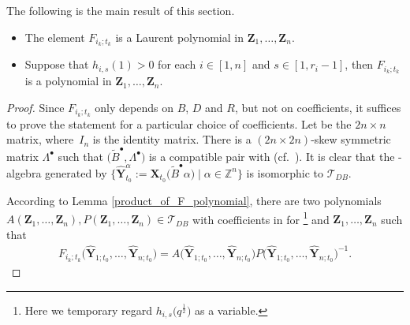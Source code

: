 The following is the main result of this section.
\begin{Theorem}\label{t:F-polynomial}\qquad
\begin{itemize}\itemsep=0pt
 \item[$(1)$] The element $F_{i_k;t_k}$ is a Laurent polynomial in $\mathbf{Z}_1,\dots, \mathbf{Z}_n$.
 \item[$(2)$] Suppose that $h_{i,s}(1)>0$ for each $i\in [1,n]$ and $s\in [1,r_i-1]$, then $F_{i_k;t_k}$ is a polynomial in $\mathbf{Z}_1,\dots, \mathbf{Z}_n$.
\end{itemize}

\end{Theorem}
\begin{proof}
 Since $F_{i_k;t_k}$ only depends on $B$, $D$ and $R$, but not on coefficients, it suffices to prove the statement for a particular choice of coefficients. Let  be the $2n\times n$ matrix, where~$I_n$ is the identity matrix. There is a $(2n\times 2n)$-skew symmetric matrix $\Lambda^{\bullet}$ such that $\bigl(\tilde{B}^{\bullet},\Lambda^{\bullet}\bigr)$ is a compatible pair with  (cf.\ \cite[Example 0.5]{Berenstein_Zelevinsky2005}). It is clear that the -algebra generated by $\bigl\{\mathbf{\hat{Y}}_{t_0}^{\alpha}:=\mathbf{X}_{t_{0}}\bigl(\tilde{B}^{\bullet}\alpha\bigr)\mid \alpha\in\mathbb{Z}^{n}\bigr\}$ is isomorphic to $\mathcal{T}_{DB}$.

 According to Lemma \ref{product_of_F_polynomial}, there are two polynomials $A(\mathbf{Z}_{1},\dots,\mathbf{Z}_{n}),P(\mathbf{Z}_{1},\dots,\mathbf{Z}_{n})\in \mathcal{T}_{DB}$ with coefficients in  for \footnote{Here we temporary regard $h_{i,s}\bigl(q^{\frac{1}{2}}\bigr)$ as a variable.} and $\mathbf{Z}_{1},\dots,\mathbf{Z}_{n}$ such that
 \begin{align}\label{fraction_of_F-polynomial}
 F_{i_{k};t_{k}}\bigl(\mathbf{\hat{Y}}_{1;t_{0}},\dots,\mathbf{\hat{Y}}_{n;t_{0}}\bigr)=A\bigl(\mathbf{\hat{Y}}_{1;t_{0}},\dots,\mathbf{\hat{Y}}_{n;t_{0}}\bigr)P\bigl(\mathbf{\hat{Y}}_{1;t_{0}},\dots,\mathbf{\hat{Y}}_{n;t_{0}}\bigr)^{-1}.
 \end{align}



\end{proof}
